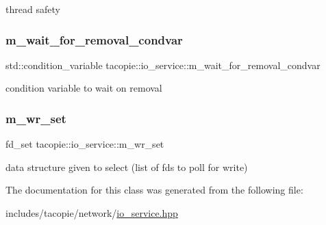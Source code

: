 thread safety \mbox{\label{classtacopie_1_1io__service_ab48cce92a369604bf3409ebbbd6d345d}} 
\subsubsection{\texorpdfstring{m\+\_\+wait\+\_\+for\+\_\+removal\+\_\+condvar}{m\_wait\_for\_removal\_condvar}}
{\footnotesize\ttfamily std\+::condition\+\_\+variable tacopie\+::io\+\_\+service\+::m\+\_\+wait\+\_\+for\+\_\+removal\+\_\+condvar\hspace{0.3cm}{\ttfamily [private]}}

condition variable to wait on removal \mbox{\label{classtacopie_1_1io__service_afca4de707285a1a373751e7e10b413ff}} 
\subsubsection{\texorpdfstring{m\+\_\+wr\+\_\+set}{m\_wr\_set}}
{\footnotesize\ttfamily fd\+\_\+set tacopie\+::io\+\_\+service\+::m\+\_\+wr\+\_\+set\hspace{0.3cm}{\ttfamily [private]}}

data structure given to select (list of fds to poll for write) 

The documentation for this class was generated from the following file\+:\begin{DoxyCompactItemize}
\item 
includes/tacopie/network/\hyperlink{io__service_8hpp}{io\+\_\+service.\+hpp}\end{DoxyCompactItemize}
